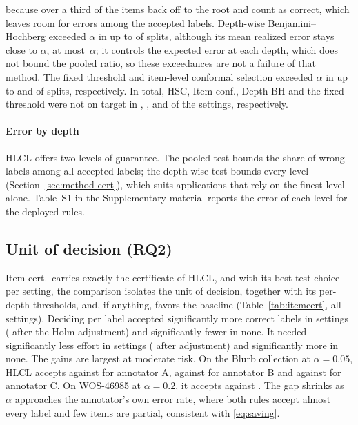 \documentclass[preprint,12pt]{elsarticle}
\theoremstyle{definition}
\newcommand{\hlcl}{\textup{\textsc{HLCL}}}
\begin{document}
because over a third of the items back off to the root and count as correct,
which leaves room for errors among the accepted labels. Depth-wise
Benjamini--Hochberg exceeded $\alpha$ in up to  of
splits, although its mean realized error stays close to $\alpha$, at most
$\,\alpha$; it controls the expected error at each
depth, which does not bound the pooled ratio, so these exceedances are not a
failure of that method. The fixed threshold and item-level conformal selection
exceeded $\alpha$ in up to  and
 of splits, respectively. In total, HSC, Item-conf.,
Depth-BH and the fixed threshold were not on target in ,
,  and
 of the  settings, respectively.

\paragraph{Error by depth}
\hlcl{} offers two levels of guarantee. The pooled test bounds the share of
wrong labels among all accepted labels; the depth-wise test bounds every level
(Section~\ref{sec:method-cert}), which suits applications that rely on the
finest level alone. Table~S1 in the Supplementary material reports the error of
each level for the deployed rules.

\subsection{Unit of decision (RQ2)}
\label{sec:res-unit}
Item-cert.\ carries exactly the certificate of \hlcl{}, and with its best test
choice per setting, the comparison isolates the unit of decision, together with
its per-depth thresholds, and, if anything, favors the baseline
(Table~\ref{tab:itemcert}, all  settings). Deciding per label accepted significantly more
correct labels in  settings (
after the Holm adjustment) and significantly fewer in none. It needed
significantly less effort in  settings
( after adjustment) and significantly more in
none. The gains are largest at moderate risk. On the Blurb collection at $\alpha=0.05$, \hlcl{} accepts
 against  for
annotator A,  against
 for annotator B and
 against  for
annotator C. On WOS-46985 at
$\alpha=0.2$, it accepts  against
. The gap shrinks as $\alpha$ approaches the
annotator's own error rate, where both rules accept almost every label and few
items are partial, consistent with \eqref{eq:saving}.
\end{document}
